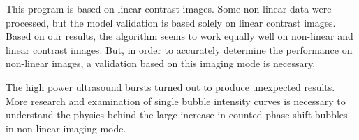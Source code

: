 This program is based on linear contrast images. Some non-linear data were processed, but the model validation is based solely on linear contrast images. Based on our results, the algorithm seems to work equally well on non-linear and linear contrast images. But, in order to accurately determine the performance on non-linear images, a validation based on this imaging mode is necessary.

The high power ultrasound bursts turned out to produce unexpected results. More research and examination of single bubble intensity curves is necessary to understand the physics behind the large increase in counted phase-shift bubbles in non-linear imaging mode. 
